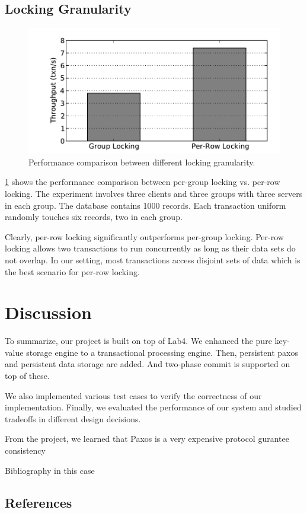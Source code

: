 \documentclass{vldb}
\begin{document}
\subsection{Locking Granularity}

\begin{figure}[t!]
	\centering
	\includegraphics[width=0.6\columnwidth]{figs/locking_granularity.pdf}
	\caption{
		Performance comparison between different locking granularity.
	}
	\label{fig:locking-granularity}
\end{figure}

\cref{fig:locking-granularity} shows the performance comparison 
between per-group locking vs. per-row locking. The experiment involves 
three clients and three groups with three servers in each group. The 
database contains 1000 records. Each transaction uniform randomly 
touches six records, two in each group. 

Clearly, per-row locking significantly outperforms per-group locking.  
Per-row locking allows two transactions to run concurrently as long as 
their data sets do not overlap. In our setting, most transactions 
access disjoint sets of data which is the best scenario for per-row 
locking. 

\section{Discussion}

To summarize, our project is built on top of Lab4. We enhanced the 
pure key-value storage engine to a transactional processing engine.
Then, persistent paxos and persistent data storage are added. And 
two-phase commit is supported on top of these. 

We also implemented various test cases to verify the correctness of 
our implementation. Finally, we evaluated the performance of our 
system and studied tradeoffs in different design decisions.

From the project, we learned that Paxos is a very expensive protocol gurantee
consistency



Bibliography in this case

\subsection{References}
\end{document}
